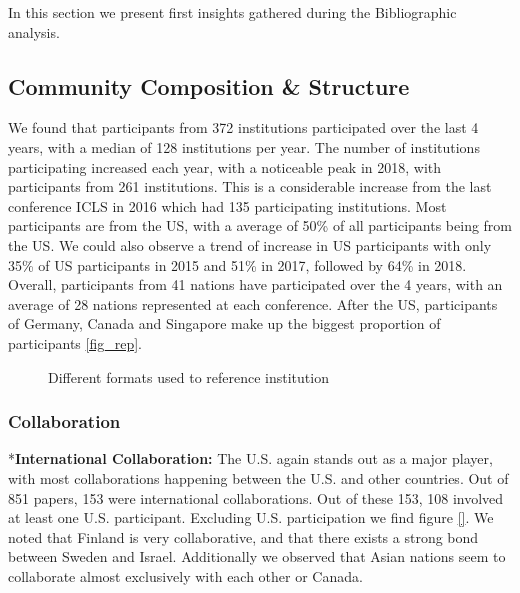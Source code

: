 \documentclass[journal,twocolumn]{IEEEtran}
\begin{document}
In this section we present first insights gathered during the
Bibliographic analysis.


    \hypertarget{community-composition-structure}{%
\subsection{Community Composition \&
Structure}\label{community-composition-structure}}

We found that participants from 372 institutions participated over the
last 4 years, with a median of 128 institutions per year. The number of
institutions participating increased each year, with a noticeable peak
in 2018, with participants from 261 institutions. This is a considerable
increase from the last conference ICLS in 2016 which had 135
participating institutions. Most participants are from the US, with a
average of 50\% of all participants being from the US. We could also
observe a trend of increase in US participants with only 35\% of US
participants in 2015 and 51\% in 2017, followed by 64\% in 2018.
Overall, participants from 41 nations have participated over the 4
years, with an average of 28 nations represented at each conference.
After the US, participants of Germany, Canada and Singapore make up the
biggest proportion of participants \ref{fig_rep}.


    \begin{figure}
        \begin{center}\end{center}
        \caption{Different formats used to reference institution}
        \label{figrep}
    \end{figure}
    
    \hypertarget{collaboration}{%
\subsubsection{Collaboration}\label{collaboration}}

*\textbf{International Collaboration:} The U.S. again stands out as a
major player, with most collaborations happening between the U.S. and
other countries. Out of 851 papers, 153 were international
collaborations. Out of these 153, 108 involved at least one U.S.
participant. Excluding U.S. participation we find figure \ref{}. We
noted that Finland is very collaborative, and that there exists a strong
bond between Sweden and Israel. Additionally we observed that Asian
nations seem to collaborate almost exclusively with each other or
Canada.
\end{document}
